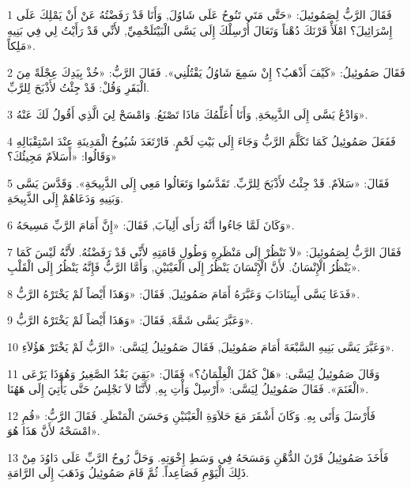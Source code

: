 \par 1 فَقَالَ الرَّبُّ لِصَمُوئِيلَ: «حَتَّى مَتَى تَنُوحُ عَلَى شَاوُلَ, وَأَنَا قَدْ رَفَضْتُهُ عَنْ أَنْ يَمْلِكَ عَلَى إِسْرَائِيلَ؟ امْلَأْ قَرْنَكَ دُهْناً وَتَعَالَ أُرْسِلْكَ إِلَى يَسَّى الْبَيْتَلَحْمِيِّ, لأَنِّي قَدْ رَأَيْتُ لِي فِي بَنِيهِ مَلِكاً».
\par 2 فَقَالَ صَمُوئِيلُ: «كَيْفَ أَذْهَبُ؟ إِنْ سَمِعَ شَاوُلُ يَقْتُلُنِي». فَقَالَ الرَّبُّ: «خُذْ بِيَدِكَ عِجْلَةً مِنَ الْبَقَرِ وَقُلْ: قَدْ جِئْتُ لأَذْبَحَ لِلرَّبِّ.
\par 3 وَادْعُ يَسَّى إِلَى الذَّبِيحَةِ, وَأَنَا أُعَلِّمُكَ مَاذَا تَصْنَعُ. وَامْسَحْ لِيَ الَّذِي أَقُولُ لَكَ عَنْهُ».
\par 4 فَفَعَلَ صَمُوئِيلُ كَمَا تَكَلَّمَ الرَّبُّ وَجَاءَ إِلَى بَيْتِ لَحْمٍ. فَارْتَعَدَ شُيُوخُ الْمَدِينَةِ عِنْدَ اسْتِقْبَالِهِ وَقَالُوا: «أَسَلاَمٌ مَجِيئُكَ؟»
\par 5 فَقَالَ: «سَلاَمٌ. قَدْ جِئْتُ لأَذْبَحَ لِلرَّبِّ. تَقَدَّسُوا وَتَعَالُوا مَعِي إِلَى الذَّبِيحَةِ». وَقَدَّسَ يَسَّى وَبَنِيهِ وَدَعَاهُمْ إِلَى الذَّبِيحَةِ.
\par 6 وَكَانَ لَمَّا جَاءُوا أَنَّهُ رَأَى أَلِيآبَ, فَقَالَ: «إِنَّ أَمَامَ الرَّبِّ مَسِيحَهُ».
\par 7 فَقَالَ الرَّبُّ لِصَمُوئِيلَ: «لاَ تَنْظُرْ إِلَى مَنْظَرِهِ وَطُولِ قَامَتِهِ لأَنِّي قَدْ رَفَضْتُهُ. لأَنَّهُ لَيْسَ كَمَا يَنْظُرُ الْإِنْسَانُ. لأَنَّ الْإِنْسَانَ يَنْظُرُ إِلَى الْعَيْنَيْنِ, وَأَمَّا الرَّبُّ فَإِنَّهُ يَنْظُرُ إِلَى الْقَلْبِ».
\par 8 فَدَعَا يَسَّى أَبِينَادَابَ وَعَبَّرَهُ أَمَامَ صَمُوئِيلَ, فَقَالَ: «وَهَذَا أَيْضاً لَمْ يَخْتَرْهُ الرَّبُّ».
\par 9 وَعَبَّرَ يَسَّى شَمَّةَ, فَقَالَ: «وَهَذَا أَيْضاً لَمْ يَخْتَرْهُ الرَّبُّ».
\par 10 وَعَبَّرَ يَسَّى بَنِيهِ السَّبْعَةَ أَمَامَ صَمُوئِيلَ, فَقَالَ صَمُوئِيلُ لِيَسَّى: «الرَّبُّ لَمْ يَخْتَرْ هَؤُلاَءِ».
\par 11 وَقَالَ صَمُوئِيلُ لِيَسَّى: «هَلْ كَمُلَ الْغِلْمَانُ؟» فَقَالَ: «بَقِيَ بَعْدُ الصَّغِيرُ وَهُوَذَا يَرْعَى الْغَنَمَ». فَقَالَ صَمُوئِيلُ لِيَسَّى: «أَرْسِلْ وَأْتِ بِهِ, لأَنَّنَا لاَ نَجْلِسُ حَتَّى يَأْتِيَ إِلَى هَهُنَا».
\par 12 فَأَرْسَلَ وَأَتَى بِهِ. وَكَانَ أَشْقَرَ مَعَ حَلاَوَةِ الْعَيْنَيْنِ وَحَسَنَ الْمَنْظَرِ. فَقَالَ الرَّبُّ: «قُمِ امْسَحْهُ لأَنَّ هَذَا هُوَ».
\par 13 فَأَخَذَ صَمُوئِيلُ قَرْنَ الدُّهْنِ وَمَسَحَهُ فِي وَسَطِ إِخْوَتِهِ. وَحَلَّ رُوحُ الرَّبِّ عَلَى دَاوُدَ مِنْ ذَلِكَ الْيَوْمِ فَصَاعِداً. ثُمَّ قَامَ صَمُوئِيلُ وَذَهَبَ إِلَى الرَّامَةِ.
